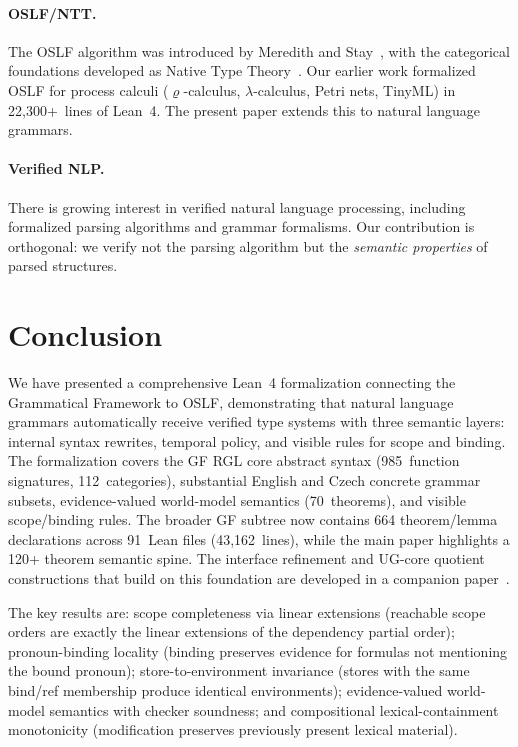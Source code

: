 \documentclass[11pt]{article}
\newcommand{\OSLF}{\textup{OSLF}}
\newcommand{\GF}{\textup{GF}}
\newcommand{\RGL}{\textup{RGL}}
\begin{document}
\paragraph{OSLF/NTT.}  The \OSLF{} algorithm was introduced
by Meredith and Stay~\cite{MeredithStayOSLF2020}, with the categorical
foundations developed as Native Type Theory~\cite{WilliamsStay2021}.
Our earlier work formalized \OSLF{} for process calculi
($\varrho$-calculus, $\lambda$-calculus, Petri nets, TinyML) in
22,300+~lines of Lean~4.  The present paper extends this to natural
language grammars.

\paragraph{Verified NLP.}  There is growing interest in verified natural
language processing, including formalized parsing algorithms and grammar
formalisms.  Our contribution is orthogonal: we verify not the parsing
algorithm but the \emph{semantic properties} of parsed structures.

\section{Conclusion}
\label{sec:conclusion}

We have presented a comprehensive Lean~4 formalization connecting the
Grammatical Framework to \OSLF{}, demonstrating that natural language
grammars automatically receive verified type systems with three semantic
layers: internal syntax rewrites, temporal policy, and visible rules for
scope and binding.  The formalization covers the \GF{} \RGL{}
core abstract syntax (985~function signatures, 112~categories), substantial English and Czech
concrete grammar subsets, evidence-valued world-model semantics (70~theorems),
and visible scope/binding rules.
The broader \GF{} subtree now contains 664 theorem/lemma declarations across
91~Lean files (43,162~lines), while the main paper highlights a 120+ theorem
semantic spine.  The interface refinement and UG-core quotient constructions
that build on this foundation are developed in a companion paper~\cite{UGCores2026}.

The key results are: scope completeness via linear extensions
(reachable scope orders are exactly the linear extensions of the
dependency partial order); pronoun-binding locality (binding preserves
evidence for formulas not mentioning the bound pronoun);
store-to-environment invariance (stores with the same bind/ref
membership produce identical environments); evidence-valued
world-model semantics with checker soundness; and compositional
lexical-containment monotonicity (modification preserves previously
present lexical material).
\end{document}
